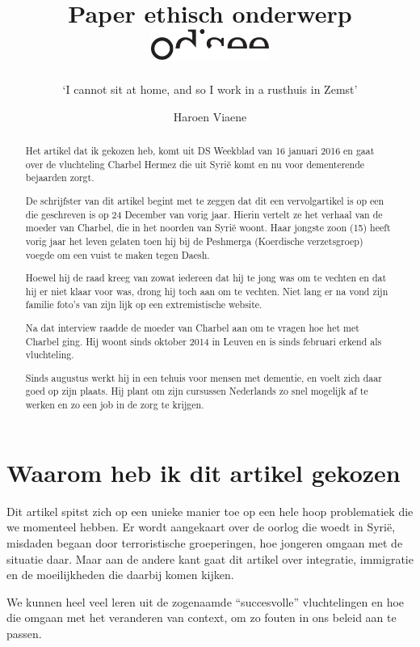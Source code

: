 \documentclass[12pt, a4paper]{paper}
\title{
\vspace{-2cm}
Paper ethisch onderwerp\\
\vspace{-1cm}
\hfill\includegraphics[height=1cm]{logo.pdf}}
\subtitle{`I cannot sit at home, and so I work in a rusthuis in Zemst'
\vspace{-.5cm}}
\author{
\vspace{-1cm}
\begin{large}
  Haroen Viaene
\end{large}
\vspace{-1cm}
}
\begin{document}
\maketitle

\begin{abstract}

Het artikel dat ik gekozen heb, komt uit DS Weekblad van 16 januari 2016 en gaat over de vluchteling Charbel Hermez die uit Syrië komt en nu voor dementerende bejaarden zorgt.

De schrijfster van dit artikel begint met te zeggen dat dit een vervolgartikel is op een die geschreven is op 24 December van vorig jaar. Hierin vertelt ze het verhaal van de moeder van Charbel, die in het noorden van Syrië woont. Haar jongste zoon (15) heeft vorig jaar het leven gelaten toen hij bij de Peshmerga (Koerdische verzetsgroep) voegde om een vuist te maken tegen Daesh.

Hoewel hij de raad kreeg van zowat iedereen dat hij te jong was om te vechten en dat hij er niet klaar voor was, drong hij toch aan om te vechten. Niet lang er na vond zijn familie foto's van zijn lijk op een extremistische website.

Na dat interview raadde de moeder van Charbel aan om te vragen hoe het met Charbel ging. Hij woont sinds oktober 2014 in Leuven en is sinds februari erkend als vluchteling.

Sinds augustus werkt hij in een tehuis voor mensen met dementie, en voelt zich daar goed op zijn plaats. Hij plant om zijn cursussen Nederlands zo snel mogelijk af te werken en zo een job in de zorg te krijgen.


\end{abstract}

\section{Waarom heb ik dit artikel gekozen}

Dit artikel spitst zich op een unieke manier toe op een hele hoop problematiek die we momenteel hebben. Er wordt aangekaart over de oorlog die woedt in Syrië, misdaden begaan door terroristische groeperingen, hoe jongeren omgaan met de situatie daar. Maar aan de andere kant gaat dit artikel over integratie, immigratie en de moeilijkheden die daarbij komen kijken.

We kunnen heel veel leren uit de zogenaamde ``succesvolle'' vluchtelingen en hoe die omgaan met het veranderen van context, om zo fouten in ons beleid aan te passen.
\end{document}
